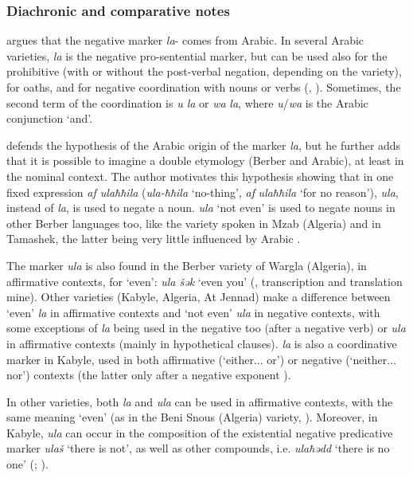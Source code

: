 \documentclass[output=paper,colorlinks,citecolor=brown]{langscibook}
\begin{document}
\subsubsection{Diachronic and comparative notes}\label{sec:siw:4.6.3}

\citet[265]{Laoust1931} argues that the negative marker \textit{la}{}- comes from Arabic.
In several Arabic varieties, \textit{la} is the negative pro-sentential marker, but can be used also for the prohibitive (with or without the post-verbal negation, depending on the variety), for oaths, and for negative coordination with nouns or verbs (\citealt[88--90]{Caubet1996}, \citealt{TaineCheikh2000}). Sometimes, the second term of the coordination is \textit{u la} or \textit{wa} \textit{la}, where \textit{u}/\textit{wa} is the Arabic conjunction ‘and’.

\citet{Souag2009,Souag2013} defends the hypothesis of the Arabic origin of the marker \textit{la}, but he further adds that it is possible to imagine a double etymology (Berber and Arabic), at least in the nominal context. The author motivates this hypothesis showing that in one fixed expression \textit{af ulaħħila} (\textit{ula-ħħila} ‘no-thing’, \textit{af} \textit{ulaħħila} ‘for no reason’), \textit{ula}, instead of \textit{la}, is used to negate a noun. \textit{ula} ‘not even’ is used to negate nouns in other Berber languages too, like the variety spoken in Mzab (Algeria) and in Tamashek, the latter being very little influenced by Arabic \citep[209--210]{Souag2013}.

The marker \textit{ula} is also found in the Berber variety of Wargla (Algeria), in affirmative contexts, for ‘even’: \textit{ula šək} ‘even you’ (\citealt[20]{Biarnay1908}, transcription and translation mine). Other varieties (Kabyle, Algeria, At Jennad) make a difference between ‘even’ \textit{la} in affirmative contexts and ‘not even’ \textit{ula} in negative contexts, with some exceptions of \textit{la} being used in the negative too (after a negative verb) or \textit{ula} in affirmative contexts (mainly in hypothetical clauses). \textit{la} is also a coordinative marker in Kabyle, used in both affirmative (‘either... or’) or negative (‘neither... nor’) contexts (the latter only after a negative exponent \citep[403]{Brugnatelli2010}). 

In other varieties, both \textit{la} and \textit{ula} can be used in affirmative contexts, with the same meaning ‘even’ (as in the Beni Snous (Algeria) variety, \citealt[217]{Destaing1914}). Moreover, in Kabyle, \textit{ula} can occur in the composition of the existential negative predicative marker \textit{ulaš} ‘there is not’, as well as other compounds, i.e. \textit{ulaħədd} ‘there is no one’ (\citealt[401]{Brugnatelli2010}; \citealt[52]{Mettouchi2021}). 
\end{document}
